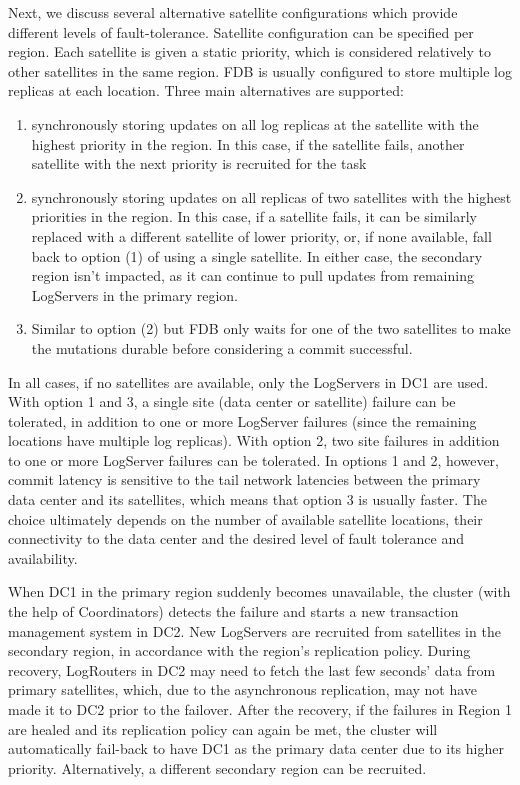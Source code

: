 \documentclass[11pt]{article}
\begin{document}
Next, we discuss several alternative satellite configurations which provide different levels of
fault-tolerance. Satellite configuration can be specified per region. Each satellite is given a static
priority, which is considered relatively to other satellites in the same region. FDB is usually
configured to store multiple log replicas at each location. Three main alternatives are supported:
\begin{enumerate}
\item synchronously storing updates on all log replicas at the satellite with the highest priority in the
region. In this case, if the satellite fails, another satellite with the next priority is recruited
for the task
\item synchronously storing updates on all replicas of two satellites with the highest priorities in the
region. In this case, if a satellite fails, it can be similarly replaced with a different satellite
of lower priority, or, if none available, fall back to option (1) of using a single satellite. In
either case, the secondary region isn’t impacted, as it can continue to pull updates from remaining
LogServers in the primary region.
\item Similar to option (2) but FDB only waits for one of the two satellites to make the mutations
durable before considering a commit successful.
\end{enumerate}

In all cases, if no satellites are available, only the LogServers in DC1 are used. With option 1 and
3, a single site (data center or satellite) failure can be tolerated, in addition to one or more
LogServer failures (since the remaining locations have multiple log replicas). With option 2, two site
failures in addition to one or more LogServer failures can be tolerated. In options 1 and 2, however,
commit latency is sensitive to the tail network latencies between the primary data center and its
satellites, which means that option 3 is usually faster. The choice ultimately depends on the number
of available satellite locations, their connectivity to the data center and the desired level of fault
tolerance and availability.

When DC1 in the primary region suddenly becomes unavailable, the cluster (with the help of
Coordinators) detects the failure and starts a new transaction management system in DC2. New
LogServers are recruited from satellites in the secondary region, in accordance with the region’s
replication policy. During recovery, LogRouters in DC2 may need to fetch the last few seconds’ data
from primary satellites, which, due to the asynchronous replication, may not have made it to DC2 prior
to the failover. After the recovery, if the failures in Region 1 are healed and its replication policy
can again be met, the cluster will automatically fail-back to have DC1 as the primary data center due
to its higher priority. Alternatively, a different secondary region can be recruited.
\end{document}
